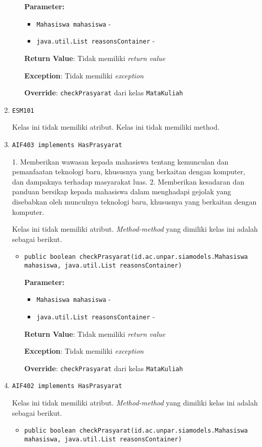 \documentclass{article}
\begin{document}
\begin{enumerate}
\begin{itemize}
\textbf{Parameter:}
\begin{itemize}
\item \texttt{Mahasiswa mahasiswa} - 
\item \texttt{java.util.List reasonsContainer} - 
\end{itemize}
\textbf{Return Value}: Tidak memiliki \textit{return value}

\textbf{Exception}: Tidak memiliki \textit{exception}

\textbf{Override}: \texttt{checkPrasyarat} dari kelas \texttt{MataKuliah}

\end{itemize}
\item \texttt{ESM101}



Kelas ini tidak memiliki atribut. Kelas ini tidak memiliki method. \item \texttt{AIF403 implements HasPrasyarat}

1. Memberikan wawasan kepada mahasiswa tentang kemunculan dan pemanfaatan teknologi baru, 
 khususnya yang berkaitan dengan komputer, dan dampaknya terhadap masyarakat luas.
 2. Memberikan kesadaran dan panduan bersikap kepada mahasiswa dalam menghadapi gejolak yang
 disebabkan oleh munculnya teknologi baru, khususnya yang berkaitan dengan komputer.

Kelas ini tidak memiliki atribut. \textit{Method-method} yang dimiliki kelas ini adalah sebagai berikut.
\begin{itemize}
\item \texttt{public boolean checkPrasyarat(id.ac.unpar.siamodels.Mahasiswa mahasiswa, java.util.List reasonsContainer)}

\textbf{Parameter:}
\begin{itemize}
\item \texttt{Mahasiswa mahasiswa} - 
\item \texttt{java.util.List reasonsContainer} - 
\end{itemize}
\textbf{Return Value}: Tidak memiliki \textit{return value}

\textbf{Exception}: Tidak memiliki \textit{exception}

\textbf{Override}: \texttt{checkPrasyarat} dari kelas \texttt{MataKuliah}

\end{itemize}
\item \texttt{AIF402 implements HasPrasyarat}



Kelas ini tidak memiliki atribut. \textit{Method-method} yang dimiliki kelas ini adalah sebagai berikut.
\begin{itemize}
\item \texttt{public boolean checkPrasyarat(id.ac.unpar.siamodels.Mahasiswa mahasiswa, java.util.List reasonsContainer)}


\end{itemize}
\end{enumerate}
\end{document}
